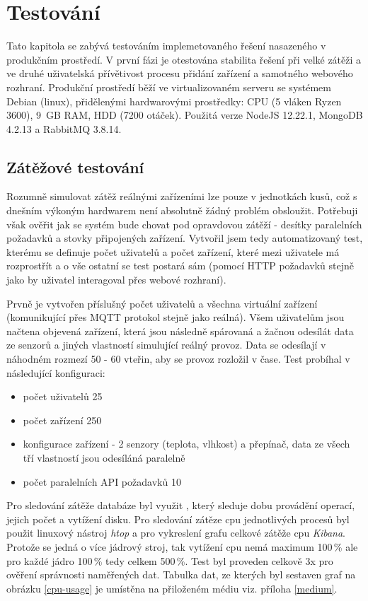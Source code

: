 \chapter{Testování}
Tato kapitola se zabývá testováním implemetovaného řešení nasazeného v produkčním prostředí. V první fázi je otestována stabilita řešení při velké zátěži a ve druhé uživatelská přívětivost procesu přidání zařízení a samotného webového rozhraní. Produkční prostředí běží ve virtualizovaném serveru se systémem Debian (linux), přidělenými hardwarovými prostředky: CPU (5 vláken Ryzen 3600), 9~GB RAM, HDD (7200 otáček). Použitá verze NodeJS 12.22.1, MongoDB 4.2.13 a RabbitMQ 3.8.14.

\section{Zátěžové testování}
Rozumně simulovat zátěž reálnými zařízeními lze pouze v jednotkách kusů, což s dnešním výkoným hardwarem není absolutně žádný problém obsloužit. Potřebuji však ověřit jak se systém bude chovat pod opravdovou zátěží - desítky paralelních požadavků a stovky připojených zařízení. Vytvořil jsem tedy automatizovaný test, kterému se definuje počet uživatelů a počet zařízení, které mezi uživatele má rozprostřít a o vše ostatní se test postará sám (pomocí HTTP požadavků stejně jako by uživatel interagoval přes webové rozhraní).

Prvně je vytvořen příslušný počet uživatelů a všechna virtuální zařízení (komunikující přes MQTT protokol stejně jako reálná). Všem uživatelům jsou načtena objevená zařízení, která jsou následně spárovaná a žačnou odesílát data ze senzorů a jiných vlastností simulující reálný provoz. Data se odesílají v náhodném rozmezí 50 - 60 vteřin, aby se provoz rozložil v čase. Test probíhal v následující konfiguraci:
\begin{itemize}
    \item počet uživatelů 25
    \item počet zařízení 250
    \item konfigurace zařízení - 2 senzory (teplota, vlhkost) a přepínač, data ze všech tří vlastností jsou odesíláná paralelně
    \item počet paralelních API požadavků 10
\end{itemize}
Pro sledování zátěže databáze byl využit  \cite{free-monitoring}, který sleduje dobu provádění operací, jejich počet a vytížení disku. Pro sledování zátěze cpu jednotlivých procesů byl použit linuxový nástroj \textit{htop} a pro vykreslení grafu celkové zátěže cpu \textit{Kibana}. Protože se jedná o více jádrový stroj, tak vytížení cpu nemá maximum 100\,\% ale pro každé jádro 100\,\% tedy celkem 500\,\%. Test byl proveden celkově 3x pro ověření správnosti naměřených dat. Tabulka dat, ze kterých byl sestaven graf na obrázku \ref{cpu-usage} je umístěna na přiloženém médiu viz. příloha \ref{medium}.

